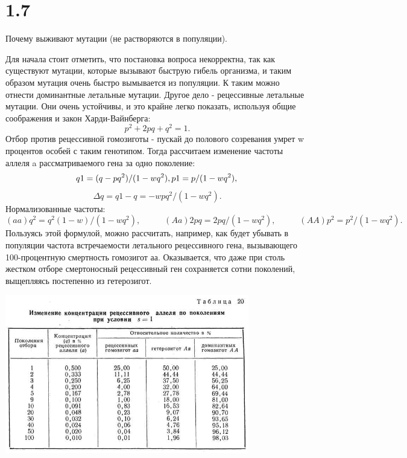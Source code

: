 \documentclass[a4paper,14pt]{article}
\begin{document}
\section*{1.7}
\begin{center}
	Почему выживают мутации (не растворяются в популяции). \\
\end{center}
Для начала стоит отметить, что постановка вопроса некорректна, так как существуют мутации, которые вызывают быструю гибель организма, и таким образом мутация очень быстро вымывается из популяции. К таким можно отнести доминантные летальные мутации.
Другое дело - рецессивные летальные мутации. Они очень устойчивы, и это крайне легко показать, используя общие соображения и закон Харди-Вайнберга:
\begin{equation*}
p^2 + 2pq + q^2 = 1.
\end{equation*}
Отбор против рецессивной гомозиготы - пускай до полового созревания умрет w процентов особей с таким генотипом. Тогда рассчитаем изменение частоты аллеля a рассматриваемого гена за одно поколение: 
\begin{equation*}
q1 = (q - pq^2) / (1 - wq^2), p1 =  p / (1 - wq^2),\\
\end{equation*}
\begin{equation*}
\Delta q = q1 - q =  - wpq^2  / (1 -wq^2).
\end{equation*}
Нормализованные частоты:
\begin{equation*}
(aa)  q^2=q^2(1-w)/(1-wq^2),\;\;\;\;\;\;\;\;\;\;(Aa) 2pq=2pq/ (1-wq^2),\;\;\;\;\;\;\;\;\;\;(AA) p^2=p^2/(1-wq^2).
\end{equation*}
Пользуясь этой формулой, можно рассчи­тать, например, как будет убывать в популяции частота встреча­емости летального рецессивного гена, вызывающего 100-процентную смертность гомозигот аа. Оказывается, что даже при столь жестком отборе смертоносный рецессивный ген сохраняется сотни поколений, выщепляясь постепенно из гетерозигот.
\begin{center}
	\includegraphics[width=0.80\textwidth]{img/1_7_0.png}
\end{center}
\end{document}
